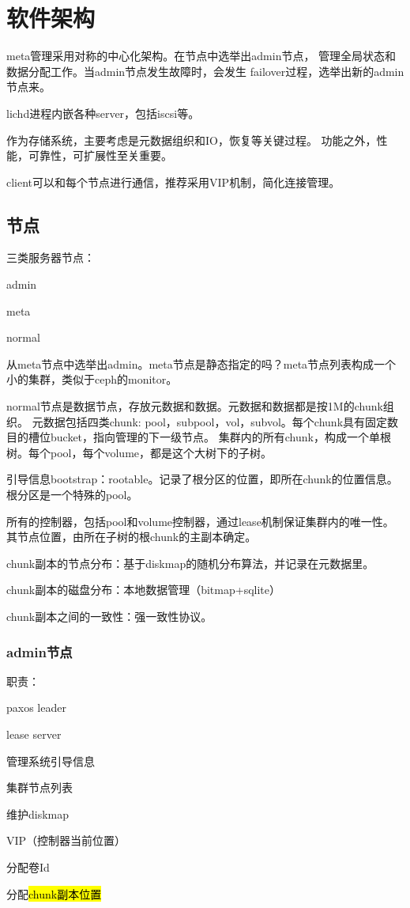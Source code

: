 \chapter{软件架构}

meta管理采用对称的中心化架构。在节点中选举出admin节点，
管理全局状态和数据分配工作。当admin节点发生故障时，会发生
failover过程，选举出新的admin节点来。

lichd进程内嵌各种server，包括iscsi等。

作为存储系统，主要考虑是元数据组织和IO，恢复等关键过程。
功能之外，性能，可靠性，可扩展性至关重要。

client可以和每个节点进行通信，推荐采用VIP机制，简化连接管理。

\section{节点}

三类服务器节点：
\begin{compactenum}
\item admin
\item meta
\item normal
\end{compactenum}

从meta节点中选举出admin。meta节点是静态指定的吗？meta节点列表构成一个小的集群，类似于ceph的monitor。

normal节点是数据节点，存放元数据和数据。元数据和数据都是按1M的chunk组织。
元数据包括四类chunk: pool，subpool，vol，subvol。每个chunk具有固定数目的槽位bucket，指向管理的下一级节点。
集群内的所有chunk，构成一个单根树。每个pool，每个volume，都是这个大树下的子树。

引导信息bootstrap：rootable。记录了根分区的位置，即所在chunk的位置信息。根分区是一个特殊的pool。

所有的控制器，包括pool和volume控制器，通过lease机制保证集群内的唯一性。
其节点位置，由所在子树的根chunk的主副本确定。

chunk副本的节点分布：基于diskmap的随机分布算法，并记录在元数据里。

chunk副本的磁盘分布：本地数据管理（bitmap+sqlite）

chunk副本之间的一致性：强一致性协议。

\subsection{admin节点}

职责：
\begin{compactenum}
\item paxos leader
\item lease server
\item 管理系统引导信息
\item 集群节点列表
\item 维护diskmap
\item VIP（控制器当前位置）
\item 分配卷Id
\item 分配\hl{chunk副本位置}
\end{compactenum}

